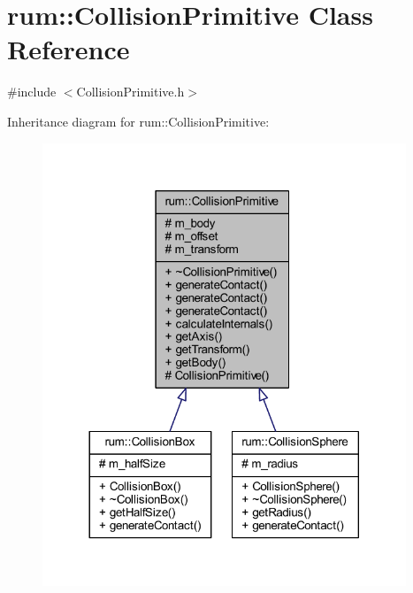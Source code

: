 \hypertarget{classrum_1_1_collision_primitive}{}\section{rum\+:\+:Collision\+Primitive Class Reference}
\label{classrum_1_1_collision_primitive}


{\ttfamily \#include $<$Collision\+Primitive.\+h$>$}



Inheritance diagram for rum\+:\+:Collision\+Primitive\+:\nopagebreak
\begin{figure}[H]
\begin{center}
\leavevmode
\includegraphics[width=308pt]{classrum_1_1_collision_primitive__inherit__graph}
\end{center}
\end{figure}


